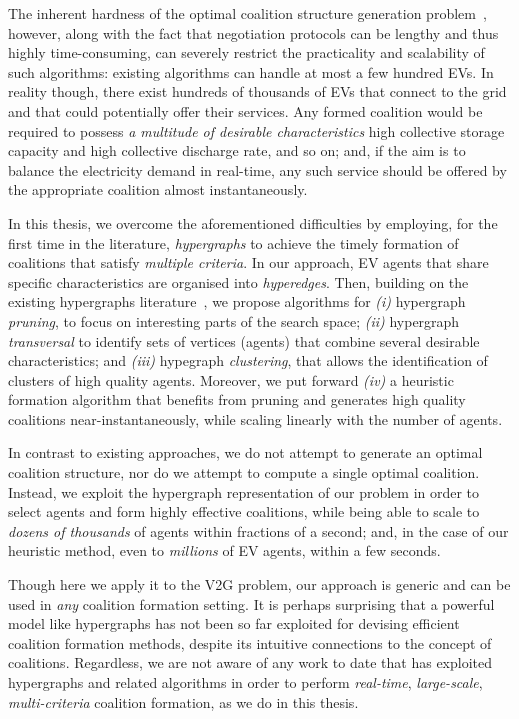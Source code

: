 The inherent hardness of the optimal coalition structure generation problem~\cite{rahwan2009anytime}, however, along with the fact that negotiation protocols can be lengthy and thus highly time-consuming, can severely restrict the practicality and scalability of such algorithms: existing algorithms can handle at most a few hundred EVs. In reality though, there exist hundreds of thousands of EVs that connect to the grid and that could potentially offer their services. Any formed coalition would be required to possess {\em a multitude of desirable characteristics} high collective storage capacity and high collective discharge rate, and so on; and, if the aim is to balance the electricity demand in real-time, any such service should be offered by the appropriate coalition almost instantaneously.

In this thesis, we overcome the aforementioned difficulties by employing, for the first time in the literature, {\em hypergraphs} to achieve the timely formation of coalitions that satisfy {\em multiple criteria}. In our approach, EV agents that share specific characteristics are organised into {\em hyperedges}. Then, building on the existing hypergraphs 
literature~\cite{eiter1995identifying,zhou2006learning}, we propose algorithms for {\em (i)} hypergraph {\em pruning},  to focus on interesting parts of the search space; 
{\em (ii)}  hypergraph {\em transversal} to identify sets of vertices (agents) that combine several desirable characteristics; and {\em (iii)} hypegraph {\em clustering}, that allows the identification of clusters of high quality agents. Moreover, we put forward {\em (iv)}  a heuristic formation algorithm that benefits from pruning and generates high quality coalitions near-instantaneously, while scaling linearly with the number of agents.

In contrast to existing approaches, we do not attempt to generate an optimal coalition structure, nor do we attempt to compute a single optimal coalition.
Instead, we exploit the hypergraph representation of our problem in order to select agents and form highly effective coalitions, while being able to scale to {\em dozens of thousands} of agents within fractions of a second; and, in the case of our heuristic method, even to {\em millions} of EV agents, within a few seconds.

Though here we apply it to the V2G problem, our approach is generic and can be used in {\em any} coalition formation setting.
It is perhaps surprising that a powerful model like hypergraphs has not been so far exploited for devising efficient coalition formation methods, despite its intuitive connections to the concept of coalitions. Regardless, we are not aware of any work to date that has exploited hypergraphs and related algorithms in order to perform {\em real-time}, {\em large-scale}, {\em multi-criteria} coalition formation, as we do in this thesis.


